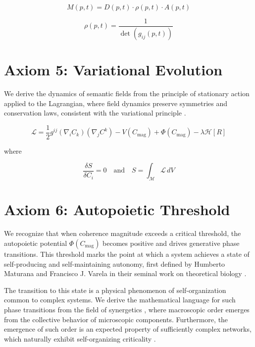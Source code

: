 \begin{equation}
M(p,t) = D(p,t) \cdot \rho(p,t) \cdot A(p,t)
\end{equation}

\begin{equation}
\rho(p,t) = \frac{1}{\det(g_{ij}(p,t))}
\end{equation}


\section{Axiom 5: Variational Evolution}
\label{1.5:axiom_5_variational_evolution}

We derive the dynamics of semantic fields from the principle of stationary action applied to the Lagrangian, where field dynamics preserve symmetries and conservation laws, consistent with the variational principle \autocite{GoldsteinPooleSafko2002, Arnold1989}.

\begin{equation}
\mathcal{L} = \frac{1}{2} g^{ij} (\nabla_i C_k)(\nabla_j C^k) - V(C_{\text{mag}}) + \Phi(C_{\text{mag}}) - \lambda \mathcal{H}[R]
\end{equation}

where

\begin{equation}
\frac{\delta S}{\delta C_i} = 0 \quad \text{and} \quad S = \int_{\mathcal{M}} \mathcal{L} \, dV
\end{equation}


\section{Axiom 6: Autopoietic Threshold}
\label{1.6:axiom_6_autopoietic_threshold}

We recognize that when coherence magnitude exceeds a critical threshold, the autopoietic potential \(\Phi(C_{\text{mag}})\) becomes positive and drives generative phase transitions. This threshold marks the point at which a system achieves a state of self-producing and self-maintaining autonomy, first defined by Humberto Maturana and Francisco J. Varela in their seminal work on theoretical biology \autocite{MaturanaVarela1980}.

The transition to this state is a physical phenomenon of self-organization common to complex systems. We derive the mathematical language for such phase transitions from the field of synergetics \autocite{Haken1983}, where macroscopic order emerges from the collective behavior of microscopic components. Furthermore, the emergence of such order is an expected property of sufficiently complex networks, which naturally exhibit self-organizing criticality \autocite{BakTangWiesenfeld1987}.


